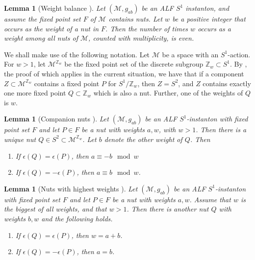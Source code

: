 \documentclass[a4paper,11pt,reqno]{amsart}
\newcommand{\nut}{P}
\newcommand{\cM}{\mathcal{M}}
\theoremstyle{plain}
\newtheorem{lemma}[thm]{Lemma}
\newcommand{\Zbb}{\mathbb{Z}}
\numberwithin{equation}{section}
\newcommand{\eps}{\epsilon}
\newcommand{\Fixed}{F}
\begin{document}
\begin{lemma}[Weight balance ] \label{lem:2.6} Let $(\cM, g_{ab})$ be an ALF $S^1$ instanton, and assume the fixed point set $\Fixed$ of $\cM$ contains nuts. Let $w$ be a positive integer that occurs as the weight of a nut in $\Fixed$. Then the number of times $w$ occurs as a weight among all nuts of $\cM$, counted with multiplicity, is even. 
\end{lemma} 
We shall make use of the following notation. Let $\cM$ be a space with an $S^1$-action. For $w >1$, let $\cM^{\Zbb_w}$ be the fixed point set of the discrete subgroup $\Zbb_w \subset S^1$. By \cite[Lemma 2.2]{2018JGP...133..181J}, the proof of which applies in the current situation,  we have that if a component $Z \subset \cM^{\Zbb_w}$ contains a fixed point $\nut$ for $S^1/\Zbb_w$, then $Z = S^2$, and $Z$ contains exactly one more fixed point $Q \subset \Zbb_w$ which is also a nut. Further, one of the weights of $Q$ is $w$. 
\begin{lemma}[Companion nuts ] \label{lem:3.5}
Let $(\cM, g_{ab})$ be an ALF $S^1$-instanton with fixed point set $\Fixed$ and let $\nut \in \Fixed$ be a nut with weights $a,w$, with $w > 1$. Then there is a unique nut $Q \in S^2 \subset \cM^{\Zbb_w}$. Let $b$ denote the other weight of $Q$. Then 
\begin{enumerate} 
\item If $\eps(Q) = \eps(\nut)$, then $a \equiv -b \mod w$
\item If $\eps(Q) = - \eps(\nut)$, then $a \equiv b \mod w$. 
\end{enumerate} 
\end{lemma} 

\begin{lemma}[Nuts with highest weights ] 
\label{lem:3.6}
Let $(\cM, g_{ab})$ be an ALF $S^1$-instanton with fixed point set $\Fixed$ and let $\nut \in \Fixed$ be a nut with weights $a,w$. Assume that $w$ is the biggest of all weights, and that $w>1$. Then there is another nut $Q$ with weights $b,w$ and the following holds.  
\begin{enumerate} 
\item If $\eps(Q) = \eps(\nut)$, then $w=a+b$.
\item If $\eps(Q) = - \eps(\nut)$, then $a=b$.
\end{enumerate} 
\end{lemma} 
\end{document}
